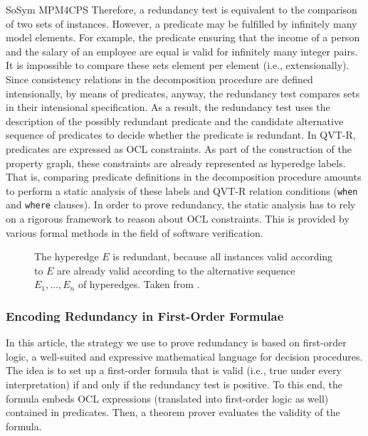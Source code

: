 \begin{copiedFrom}{SoSym MPM4CPS}
Therefore, a redundancy test is equivalent to the comparison of two sets of instances. However, a predicate may be fulfilled by infinitely many model elements. For example, the predicate ensuring that the income of a person and the salary of an employee are equal is valid for infinitely many integer pairs. It is impossible to compare these sets element per element (i.e., extensionally). 
Since consistency relations in the decomposition procedure are defined intensionally, by means of predicates, anyway, the redundancy test compares sets in their intensional specification.
As a result, the redundancy test uses the description of the possibly redundant predicate and the candidate alternative sequence of predicates to decide whether the predicate is redundant.  
In QVT-R, predicates are expressed as OCL constraints. As part of the construction of the property graph, these constraints are already represented as hyperedge labels. That is, comparing predicate definitions in the decomposition procedure amounts to perform a static analysis of these labels and QVT-R relation conditions (\texttt{when} and \texttt{where} clauses). In order to prove redundancy, the static analysis has to rely on a rigorous framework to reason about OCL constraints. This is provided by various formal methods in the field of software verification.

\begin{figure}
    \centering
    
    \caption{The hyperedge $E$ is redundant, because all instances valid according to $E$ are already valid according to the alternative sequence $E_1, \dots, E_n$ of hyperedges. Taken from .}
    \label{fig:correctness:prevention:comparison_validinstances}
\end{figure}

\subsubsection{Encoding Redundancy in First-Order Formulae}

In this article, the strategy we use to prove redundancy is based on first-order logic, a well-suited and expressive mathematical language for decision procedures. The idea is to set up a first-order formula that is valid (i.e., true under every interpretation) if and only if the redundancy test is positive. To this end, the formula embeds OCL expressions (translated into first-order logic as well) contained in predicates. Then, a theorem prover evaluates the validity of the formula. 


\end{copiedFrom}
